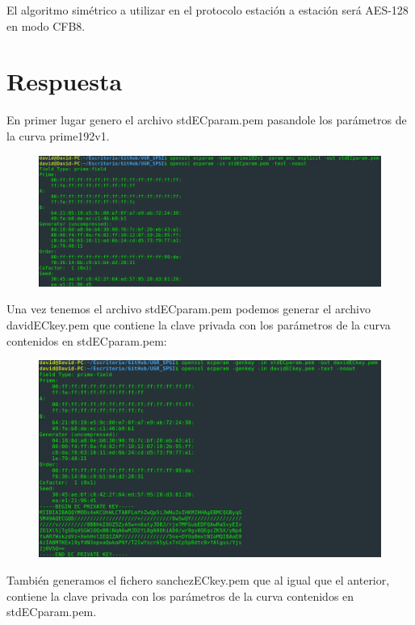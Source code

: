 \documentclass[10pt,a4paper,spanish]{report}
\begin{document}
\noindent
El algoritmo simétrico a utilizar en el protocolo estación a estación será AES-128 en modo CFB8.


\section{Respuesta}
\noindent
En primer lugar genero el archivo stdECparam.pem pasandole los parámetros de la curva prime192v1.

\begin{figure}[!hbp]
 \centering  \includegraphics[width=1\textwidth]{./Imagenes/8_1.png}
\end{figure}

\newpage
\noindent
Una vez tenemos el archivo stdECparam.pem podemos generar el archivo davidECkey.pem que contiene la clave privada con los parámetros de la curva contenidos en stdECparam.pem:

\begin{figure}[!hbp]
 \centering  \includegraphics[width=1\textwidth]{./Imagenes/8_2.png}
\end{figure}

\noindent
También generamos el fichero sanchezECkey.pem que al igual que el anterior, contiene la clave privada con los parámetros de la curva contenidos en stdECparam.pem.
\end{document}
